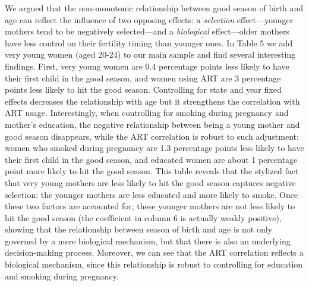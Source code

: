 \documentclass[a4paper, 11.5 pt]{article}
\theoremstyle{plain}
\begin{document}
\begin{doublespace}
We argued that the non-monotonic relationship between good season of birth and age can reflect the influence of two opposing effects: a \emph{selection} effect---younger mothers tend to be negatively selected---and a \emph{biological} effect---older mothers have less control on their fertility timing than younger ones. In Table 5 we add very young women (aged 20-24) to our main sample and find several interesting findings. First, very young women are 0.4 percentage points less likely to have their first child in the good season, and women using ART are 3 percentage points less likely to hit the good season. Controlling for state and year fixed effects decreases the relationship with age but it strengthens the correlation with ART usage. Interestingly, when controlling for smoking during pregnancy and mother's education, the negative relationship between being a young mother and good season disappears, while the ART correlation is robust to such adjustment: women who smoked during pregnancy are 1.3 percentage points less likely to have their first child in the good season, and educated women are about 1 percentage point more likely to hit the good season. This table reveals that the stylized fact that very young mothers are less likely to hit the good season captures negative selection: the younger mothers are less educated and more likely to smoke. Once these two factors are accounted for, these younger mothers are not less likely to hit the good season (the coefficient in column 6 is actually weakly positive), showing that the relationship between season of birth and age is not only governed by a mere biological mechanism, but that there is also an underlying decision-making process. Moreover, we can see that the ART correlation reflects a biological mechanism, since this relationship is robust to controlling for education and smoking during pregnancy.


\end{doublespace}
\end{document}
